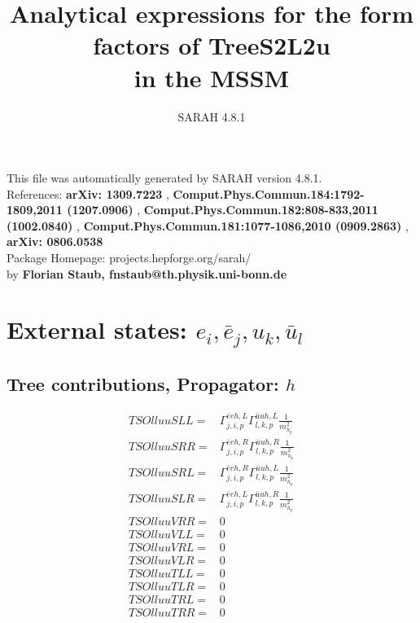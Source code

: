 \documentclass[A4,landscape]{article}
\begin{document}
\title{Analytical expressions for the form factors of TreeS2L2u\\ in the MSSM } 
 \author{SARAH 4.8.1} 
 \maketitle 
 \vspace{10cm} 
This file was automatically generated by SARAH version 4.8.1.  \\ 
References: {\bf arXiv: 1309.7223 }, {\bf Comput.Phys.Commun.184:1792-1809,2011 (1207.0906) }, {\bf Comput.Phys.Commun.182:808-833,2011 (1002.0840) }, {\bf Comput.Phys.Commun.181:1077-1086,2010 (0909.2863) }, {\bf arXiv: 0806.0538 } \\ 
Package Homepage: projects.hepforge.org/sarah/ \\ 
by {\bf Florian Staub, fnstaub@th.physik.uni-bonn.de} 
 \pagebreak 
 \tableofcontents 
 \pagebreak 
\section{External states: ${e_{{i}}, \bar{e}_{{j}}, u_{{k}}, \bar{u}_{{l}}}$} 
\subsection{Tree contributions, Propagator: $h$} 

\begin{align} 
  TSOlluuSLL= & \Gamma^{\bar{e}e h ,L}_{j, i, p} \Gamma^{\bar{u}u h ,L}_{l, k, p} \frac{1}{m^2_{h_{{p}}}} \\ 
  TSOlluuSRR= & \Gamma^{\bar{e}e h ,R}_{j, i, p} \Gamma^{\bar{u}u h ,R}_{l, k, p} \frac{1}{m^2_{h_{{p}}}} \\ 
  TSOlluuSRL= & \Gamma^{\bar{e}e h ,R}_{j, i, p} \Gamma^{\bar{u}u h ,L}_{l, k, p} \frac{1}{m^2_{h_{{p}}}} \\ 
  TSOlluuSLR= & \Gamma^{\bar{e}e h ,L}_{j, i, p} \Gamma^{\bar{u}u h ,R}_{l, k, p} \frac{1}{m^2_{h_{{p}}}} \\ 
  TSOlluuVRR= & 0 \\ 
  TSOlluuVLL= & 0 \\ 
  TSOlluuVRL= & 0 \\ 
  TSOlluuVLR= & 0 \\ 
  TSOlluuTLL= & 0 \\ 
  TSOlluuTLR= & 0 \\ 
  TSOlluuTRL= & 0 \\ 
  TSOlluuTRR= & 0 \\ 
\end{align} 
\end{document}
